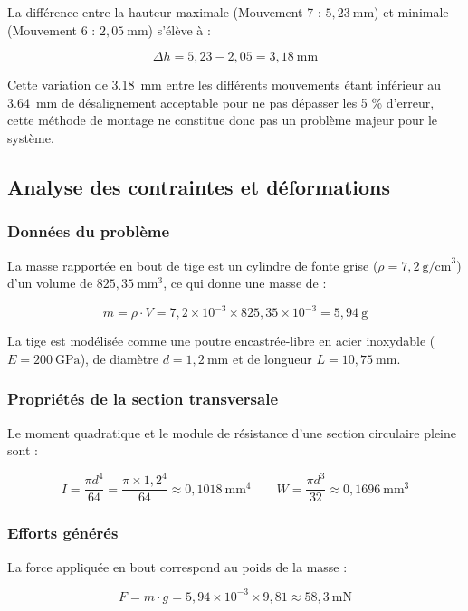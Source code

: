 La différence entre la hauteur maximale (Mouvement 7 : $5{,}23\ \text{mm}$) et minimale (Mouvement 6 : $2{,}05\ \text{mm}$) s'élève à :

\[
  \Delta h = 5{,}23 - 2{,}05 = 3{,}18\ \text{mm}
\]

Cette variation de \SI{3.18}{\mm} entre les différents mouvements étant inférieur au \SI{3.64}{\mm} de désalignement acceptable pour ne pas dépasser les 5 \% d'erreur, cette méthode de montage ne constitue donc pas un problème majeur pour le système.

\subsection{Analyse des contraintes et déformations}

\subsubsection{Données du problème}

La masse rapportée en bout de tige est un cylindre de fonte grise ($\rho = 7{,}2\ \text{g/cm}^3$) d'un volume de $825{,}35\ \text{mm}^3$, ce qui donne une masse de :

\[
  m = \rho \cdot V = 7{,}2 \times 10^{-3} \times 825{,}35 \times 10^{-3} = 5{,}94\ \text{g}
\]

La tige est modélisée comme une poutre encastrée-libre en acier inoxydable ($E = 200\ \text{GPa}$), de diamètre $d = 1{,}2\ \text{mm}$ et de longueur $L = 10{,}75\ \text{mm}$.

\subsubsection{Propriétés de la section transversale}

Le moment quadratique et le module de résistance d'une section circulaire pleine sont :

\[
  I = \frac{\pi d^4}{64} = \frac{\pi \times 1{,}2^4}{64} \approx 0{,}1018\ \text{mm}^4
  \qquad
  W = \frac{\pi d^3}{32} \approx 0{,}1696\ \text{mm}^3
\]

\subsubsection{Efforts générés}

La force appliquée en bout correspond au poids de la masse :

\[
  F = m \cdot g = 5{,}94 \times 10^{-3} \times 9{,}81 \approx 58{,}3\ \text{mN}
\]

